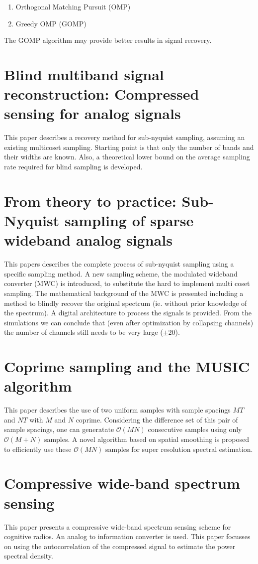 \documentclass[report, oneside, a4paper, openany]{memoir}
\begin{document}
\begin{enumerate}
	\item Orthogonal Matching Pursuit (OMP)
	\item Greedy OMP (GOMP)
\end{enumerate}

The GOMP algorithm may provide better results in signal recovery.
\section{Blind multiband signal reconstruction: Compressed sensing for analog signals \cite{mishali2009blind}}
This paper describes a recovery method for sub-nyquist sampling, assuming an existing multicoset sampling. Starting point is that only the number of bands and their widths are known. Also, a theoretical lower bound on the average sampling rate required for blind sampling is developed.
\section{From theory to practice: Sub-Nyquist sampling of sparse wideband analog signals \cite{mishali2010theory}}
%
This papers describes the complete process of sub-nyquist sampling using a specific sampling method. A new sampling scheme, the modulated wideband converter (MWC) is introduced, to substitute the hard to implement multi coset sampling. The mathematical background of the MWC is presented including a method to blindly recover the original spectrum (ie. without prior knowledge of the spectrum). A digital architecture to process the signals is provided. From the simulations we can conclude that (even after optimization by collapsing channels) the number of channels  still needs to be very large ($\pm20$). 
\section{Coprime sampling and the MUSIC algorithm \cite{pal2011coprime}}
This paper describes the use of two uniform samples with sample
spacings $MT$ and $NT$ with  $M$ and $N$ coprime. Considering the difference set of this pair of sample spacings, one can generatate $\mathcal{O}(MN)$ consecutive samples using only $\mathcal{O}(M+N)$ samples. A novel algorithm based on spatial smoothing is proposed to efficiently use these $\mathcal{O}(MN)$ samples for super resolution spectral estimation.
\section{Compressive wide-band spectrum sensing \cite{polo2009compressive}}
%
This paper presents a compressive wide-band spectrum sensing scheme for cognitive radios. An analog to information converter is used. This paper focusses on using the autocorrelation of the compressed signal to estimate the power spectral density.
\end{document}
